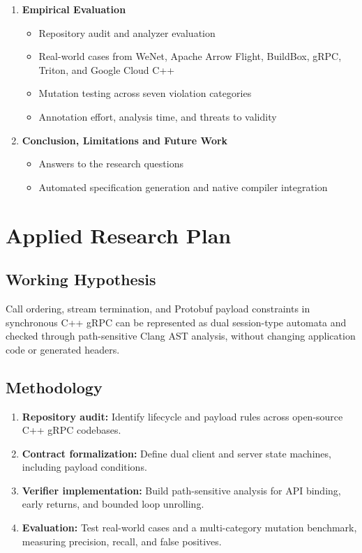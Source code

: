 \documentclass[11pt,a4paper]{article}
\begin{document}
\begin{enumerate}
    \item \textbf{Empirical Evaluation}
    \begin{itemize}
        \item Repository audit and analyzer evaluation
        \item Real-world cases from WeNet, Apache Arrow Flight, BuildBox, gRPC, Triton, and Google Cloud C++
        \item Mutation testing across seven violation categories
        \item Annotation effort, analysis time, and threats to validity
    \end{itemize}

    \item \textbf{Conclusion, Limitations and Future Work}
    \begin{itemize}
        \item Answers to the research questions
        \item Automated specification generation and native compiler integration
    \end{itemize}
\end{enumerate}

\section{Applied Research Plan}

\subsection{Working Hypothesis}
Call ordering, stream termination, and Protobuf payload constraints in synchronous C++ gRPC can be represented as dual session-type automata and checked through path-sensitive Clang AST analysis, without changing application code or generated headers.

\subsection{Methodology}
\begin{enumerate}
    \item \textbf{Repository audit:} Identify lifecycle and payload rules across open-source C++ gRPC codebases.
    \item \textbf{Contract formalization:} Define dual client and server state machines, including payload conditions.
    \item \textbf{Verifier implementation:} Build path-sensitive analysis for API binding, early returns, and bounded loop unrolling.
    \item \textbf{Evaluation:} Test real-world cases and a multi-category mutation benchmark, measuring precision, recall, and false positives.
\end{enumerate}
\end{document}
